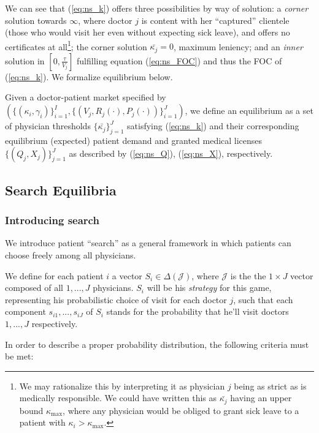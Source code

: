 \documentclass{article}
\begin{document}
We can see that (\ref{eq:ns_k}) offers three possibilities by way of solution: a \textit{corner} solution towards $\infty$, where doctor $j$ is content with her ``captured'' clientele (those who would visit her even without expecting sick leave), and offers no certificates at all\footnote{We may rationalize this by interpreting it as physician $j$ being as strict as is medically responsible. We could have written this as $\bar{\kappa_j}$ having an upper bound $\kappa_{\operatorname{max}}$, where any physician would be obliged to grant sick leave to a patient with $\kappa_i > \kappa_{\operatorname{max}}$.}; the corner solution $\bar{\kappa_j} = 0$, maximum leniency; and an \textit{inner} solution in $[0,\frac{\tau}{V_j}]$ fulfilling equation (\ref{eq:ns_FOC}) and thus the FOC of (\ref{eq:ns_k}). We formalize equilibrium below.

\begin{equilibrium}
    \label{ns_eq}
Given a doctor-patient market specified by $(\{(\kappa_i,\gamma_i)\}_{i =1}^{I},\{(V_j,R_j(\cdot),P_j(\cdot))\}_{i =1}^{J})$, we define an equilibrium as a set of physician thresholds $\{\bar{\kappa_j}\}_{j =1}^{J}$ satisfying (\ref{eq:ns_k}) and their corresponding equilibrium (expected) patient demand and granted medical licenses $\{(Q_j,X_j)\}_{j =1}^{J}$ as described by (\ref{eq:ns_Q}), (\ref{eq:ns_X}), respectively.
\end{equilibrium}

\subsection{Search Equilibria}

\subsubsection{Introducing search}

We introduce patient ``search'' as a general framework in which patients can choose freely among all physicians.

We define for each patient $i$ a vector $S_i \in \Delta(\mathcal{J})$, where $\mathcal{J}$ is the the $1 \times J$ vector composed of all $1, ..., J$ physicians. $S_i$ will be his \textit{strategy} for this game, representing his probabilistic choice of visit for each doctor $j$, such that each component $s_{i1}, ... , s_{iJ}$ of $S_i$ stands for the probability that he'll visit doctors $1, ..., J$ respectively.

In order to describe a proper probability distribution, the following criteria must be met:
\end{document}
